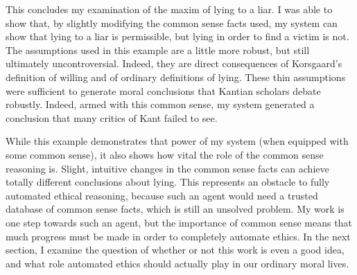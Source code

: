 \begin{isabellebody}
\begin{isamarkuptext}
This concludes my examination of the maxim of lying to a liar. I was able to show that, by slightly
modifying the common sense facts used, my system can show that lying to a liar is permissible, but lying 
in order to find a victim is not. The assumptions used in this example are a little more robust, but still
ultimately uncontroversial. Indeed, they are direct consequences of Korsgaard's definition of willing 
and of ordinary definitions of lying. These thin assumptions were sufficient to generate moral conclusions
that Kantian scholars debate robustly. Indeed, armed with this common sense, my system generated 
a conclusion that many critics of Kant failed to see. 

While this example demonstrates that power of my system (when equipped with some common sense), it 
also shows how vital the role of the common sense reasoning is. Slight, intuitive changes in the common
sense facts can achieve totally different conclusions about lying. This represents an obstacle to 
fully automated ethical reasoning, because such an agent would need a trusted database of common 
sense facts, which is still an unsolved problem. My work is one step towards such an agent, but the 
importance of common sense means that much progress must be made in order to completely automate ethics.
In the next section, I examine the question of whether or not this work is even a good idea, and what role
automated ethics should actually play in our ordinary moral lives.%
\end{isamarkuptext}\isamarkuptrue%
%
\isadelimdocument
%
\endisadelimdocument
%
\isatagdocument
%
\isamarkuptrue%
%
\endisatagdocument
{\isafolddocument}%
%
\isadelimdocument
%
\endisadelimdocument
%
\isadelimtheory
%
\endisadelimtheory
%
\isatagtheory
%
\endisatagtheory
{\isafoldtheory}%
%
\isadelimtheory
%
\endisadelimtheory
%
\end{isabellebody}%
\endinput
